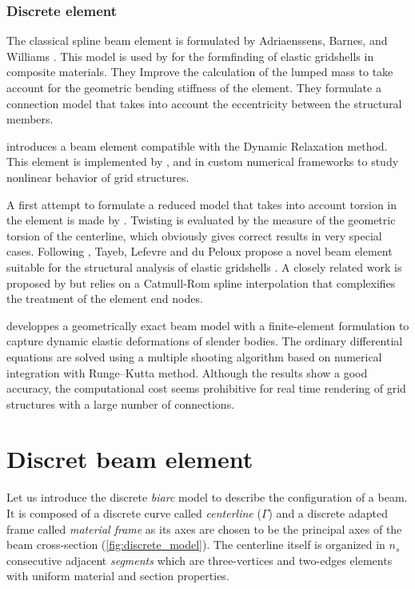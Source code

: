 \subsubsection{Discrete element}

The classical  spline beam element is formulated by Adriaenssens, Barnes, and Williams \cite{Barnes1999,Adriaenssens1999,Adriaenssens2001}. This model is used by \cite{Douthe2006} for the formfinding of elastic gridshells in composite materials. They Improve the calculation of the lumped mass to take account for the geometric bending stiffness of the element. They formulate a connection model that takes into account the eccentricity between the structural members.

 introduces a  beam element compatible with the Dynamic Relaxation method. This element is implemented by ,  and \cite{DAmico2014} in custom numerical frameworks to study nonlinear behavior of grid structures.

A first attempt to formulate a reduced model that takes into account torsion in the element is made by . Twisting is evaluated by the measure of the geometric torsion of the centerline, which obviously gives correct results in very special cases. Following , Tayeb, Lefevre and du Peloux propose a novel  beam element suitable for the structural analysis of elastic gridshells \cite{DuPeloux2015,Lefevre2017}. A closely related work is proposed by  but relies on a Catmull-Rom spline interpolation that complexifies the treatment of the element end nodes.

 developpes a geometrically exact beam model with a finite-element formulation to capture dynamic elastic deformations of slender bodies. The ordinary differential equations are solved using a multiple shooting algorithm based on numerical integration with Runge–Kutta method. Although the results show a good accuracy, the computational cost seems prohibitive for real time rendering of grid structures with a large number of connections.






\section{Discret beam element}\label{sec:dmodel}
Let us introduce the discrete \emph{biarc} model to describe the configuration of a beam. It is composed of a discrete curve called \emph{centerline} ($\Gamma$) and a discrete adapted frame called \emph{material frame} as its axes are chosen to be the principal axes of the beam cross-section (\cref{fig:discrete_model}). The centerline itself is organized in $n_s$ consecutive adjacent \emph{segments} which are three-vertices and two-edges elements with uniform material and section properties.

